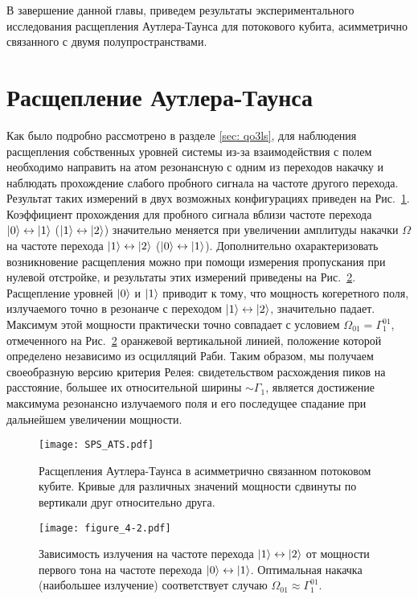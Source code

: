 В завершение данной главы, приведем результаты экспериментального исследования расщепления Аутлера-Таунса для потокового кубита, асимметрично связанного с двумя полупространствами. 

\section{Расщепление Аутлера-Таунса}
Как было подробно рассмотрено в разделе \ref{sec: qo3ls}, для наблюдения расщепления собственных уровней системы из-за взаимодействия с полем необходимо направить на атом резонансную с одним из переходов накачку и наблюдать прохождение слабого пробного сигнала на частоте другого перехода. Результат таких измерений в двух возможных конфигурациях приведен на Рис.~\ref{fig: sps_ats}. Коэффициент прохождения для пробного сигнала вблизи частоте перехода $\ket{0}\leftrightarrow\ket{1}$ ($\ket{1}\leftrightarrow\ket{2}$) значительно меняется при увеличении амплитуды накачки $\Omega$ на частоте перехода $\ket{1}\leftrightarrow\ket{2}$ ($\ket{0}\leftrightarrow\ket{1}$). Дополнительно охарактеризовать возникновение расщепления можно при помощи измерения пропускания при нулевой отстройке, и результаты этих измерений приведены на Рис.~\ref{lines}. Расщепление уровней $\ket{0}$ и $\ket{1}$ приводит к тому, что мощность когеретного поля, излучаемого точно в резонанче с переходом $\ket{1} \leftrightarrow \ket{2}$, значительно падает. Максимум этой мощности практически точно совпадает с условием $\Omega_01 = \Gamma_1^{01}$, отмеченного на Рис.~\ref{lines} оранжевой вертикальной линией, положение которой определено независимо из осцилляций Раби. Таким образом, мы получаем своеобразную версию критерия Релея: свидетельством расхождения пиков на расстояние, большее их относительной ширины $\sim \Gamma_1$, является достижение максимума резонансно излучаемого поля и его последущее спадание при дальнейшем увеличении мощности. 
\begin{figure}[h]
	\centering
	\texttt{[image: SPS\_ATS.pdf]}
	\caption[Расщепления Аутлера-Таунса в асимметрично связанном потоковом кубите.]{Расщепления Аутлера-Таунса в асимметрично связанном потоковом кубите. Кривые для различных значений мощности сдвинуты по вертикали друг относительно друга.}
	\label{fig: sps_ats}
\end{figure}
\begin{figure}[!ht] 
	\centering
	\texttt{[image: figure\_4-2.pdf]} 
	\caption[Зависимость излучения на частоте перехода $\ket{1}\leftrightarrow \ket{2}$ от мощности первого тона на частоте перехода $\ket{0}\leftrightarrow \ket{1}$]{Зависимость излучения на частоте перехода $\ket{1}\leftrightarrow \ket{2}$ от мощности первого тона на частоте перехода $\ket{0}\leftrightarrow \ket{1}$. Оптимальная накачка (наибольшее излучение) соответствует случаю $\Omega_{01} \approx \Gamma_1^{01}$.}
	\label{lines}
\end{figure} 

